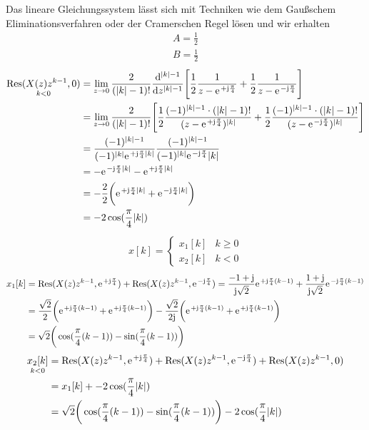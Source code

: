 \documentclass[11pt,a4paper,DIV=12]{scrartcl}
\begin{document}
Das lineare Gleichungssystem lässt sich mit Techniken wie dem Gaußschem Eliminationsverfahren oder der Cramerschen Regel lösen und wir erhalten
\begin{align}
	A=\frac{1}{2} \nonumber \\
	B=\frac{1}{2}
\end{align}
\begin{align}
	\underset{k<0}{\mathrm{Res}(X(z)z^{k-1},0)}&=\lim\limits_{z\rightarrow0}\frac{2}{(|k|-1)!}\frac{\mathrm{d}^{|k|-1}}{\mathrm{d}z^{|k|-1}}\Bigg[\frac{1}{2}\frac{1}{z-\e^{+\im\frac{\pi}{4}}}+\frac{1}{2}\frac{1}{z-\e^{-\im\frac{\pi}{4}}}\Bigg]\nonumber\\
	&=\lim\limits_{z\rightarrow0}\frac{2}{(|k|-1)!}\Bigg[\frac{1}{2}\frac{(-1)^{|k|-1}\cdot(|k|-1)!}{(z-\e^{+\im\frac{\pi}{4}})^{|k|}}+\frac{1}{2}\frac{(-1)^{|k|-1}\cdot(|k|-1)!}{(z-\e^{-\im\frac{\pi}{4}})^{|k|}}\Bigg]\nonumber\\
	&=\frac{(-1)^{|k|-1}}{(-1)^{|k|}\e^{+\im\frac{\pi}{4}|k|}}\frac{(-1)^{|k|-1}}{(-1)^{|k|}\e^{-\im\frac{\pi}{4}}|k|}\nonumber\\
	&=-\e^{-\im\frac{\pi}{4}|k|}-\e^{+\im\frac{\pi}{4}|k|}\nonumber\\
	&=-\frac{2}{2}\bigg(\e^{+\im\frac{\pi}{4}|k|}+\e^{-\im\frac{\pi}{4}|k|}\bigg)\nonumber\\
	&=-2\cos(\frac{\pi}{4}|k|)
\end{align}
\begin{align}
	x[k]=\begin{cases}
		x_1[k] &k\geq0 \\
		x_2[k] &k<0
	\end{cases}
\end{align}
\begin{align}
	x_1[k]&=\mathrm{Res}(X(z)z^{k-1},\e^{+\im\frac{\pi}{4}})+\mathrm{Res}(X(z)z^{k-1},\e^{-\im\frac{\pi}{4}})=\frac{-1+\im}{\im\sqrt{2}}\e^{+\im\frac{\pi}{4}(k-1)}+\frac{1+\im}{\im\sqrt{2}}\e^{-\im\frac{\pi}{4}(k-1)}\nonumber\\
	&=\frac{\sqrt{2}}{2}\bigg (\e^{+\im\frac{\pi}{4}(k-1)}+\e^{+\im\frac{\pi}{4}(k-1)}\bigg )-\frac{\sqrt{2}}{2\im} \bigg (\e^{+\im\frac{\pi}{4}(k-1)}+\e^{+\im\frac{\pi}{4}(k-1)}\bigg)\nonumber\\
	&=\sqrt{2}\bigg(\cos(\frac{\pi}{4}(k-1))-\sin(\frac{\pi}{4}(k-1))\bigg)
\end{align}
\begin{align}
	\underset{k<0}{x_2[k]}&=\mathrm{Res}(X(z)z^{k-1},\e^{+\im\frac{\pi}{4}})+\mathrm{Res}(X(z)z^{k-1},\e^{-\im\frac{\pi}{4}})+\mathrm{Res}(X(z)z^{k-1},0)\nonumber\\
	&=x_1[k]+-2\cos(\frac{\pi}{4}|k|) \nonumber\\
	&=\sqrt{2}\bigg(\cos(\frac{\pi}{4}(k-1))-\sin(\frac{\pi}{4}(k-1))\bigg)-2\cos(\frac{\pi}{4}|k|)
\end{align}
\end{document}
